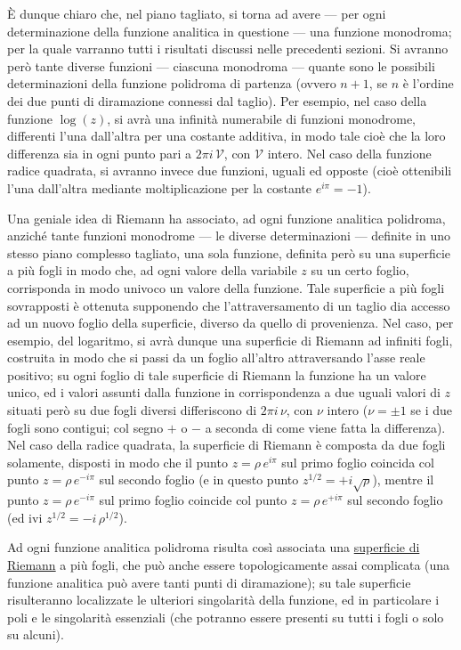 \documentclass[11pt, a4paper]{book}
\numberwithin{equation}{section}
\begin{document}
È dunque chiaro che, nel piano tagliato, si torna ad avere — per ogni determinazione della funzione analitica in questione — una funzione monodroma; per la quale varranno tutti i risultati discussi nelle precedenti sezioni. Si avranno però tante diverse funzioni — ciascuna monodroma — quante sono le possibili determinazioni della funzione polidroma di partenza (ovvero $n+1$, se $n$ è l'ordine dei due punti di diramazione connessi dal taglio). Per esempio, nel caso della funzione $\log(z)$, si avrà una infinità numerabile di funzioni monodrome, differenti l'una dall'altra per una costante additiva, in modo tale cioè che la loro differenza sia in ogni punto pari a $2\pi i\,\mathcal{V}$, con $\mathcal{V}$ intero. Nel caso della funzione radice quadrata, si avranno invece due funzioni, uguali ed opposte (cioè ottenibili l'una dall'altra mediante moltiplicazione per la costante $e^{i\pi} = -1$).

Una geniale idea di Riemann ha associato, ad ogni funzione analitica polidroma, anziché tante funzioni monodrome — le diverse determinazioni — definite in uno stesso piano complesso tagliato, una sola funzione, definita però su una superficie a più fogli in modo che, ad ogni valore della variabile $z$ su un certo foglio, corrisponda in modo univoco un valore della funzione. Tale superficie a più fogli sovrapposti è ottenuta supponendo che l'attraversamento di un taglio dia accesso ad un nuovo foglio della superficie, diverso da quello di provenienza. Nel caso, per esempio, del logaritmo, si avrà dunque una superficie di Riemann ad infiniti fogli, costruita in modo%
che si passi da un foglio all'altro attraversando l'asse reale positivo; su ogni foglio di tale superficie di Riemann la funzione ha un valore unico, ed i valori assunti dalla funzione in corrispondenza a due uguali valori di $z$ situati però su due fogli diversi differiscono di $2\pi i\,\nu$, con $\nu$ intero ($\nu = \pm 1$ se i due fogli sono contigui; col segno $+$ o $-$ a seconda di come viene fatta la differenza). Nel caso della radice quadrata, la superficie di Riemann è composta da due fogli solamente, disposti in modo che il punto $z = \rho\,e^{i\pi}$ sul primo foglio coincida col punto $z = \rho\,e^{-i\pi}$ sul secondo foglio (e in questo punto $z^{1/2} = +i\sqrt{\rho}$), mentre il punto $z = \rho\,e^{-i\pi}$ sul primo foglio coincide col punto $z = \rho\,e^{+i\pi}$ sul secondo foglio (ed ivi $z^{1/2} = -i\,\rho^{1/2}$).

Ad ogni funzione analitica polidroma risulta così associata una \underline{superficie di Riemann} a più fogli, che può anche essere topologicamente assai complicata (una funzione analitica può avere tanti punti di diramazione); su tale superficie risulteranno localizzate le ulteriori singolarità della funzione, ed in particolare i poli e le singolarità essenziali (che potranno essere presenti su tutti i fogli o solo su alcuni).
\end{document}
